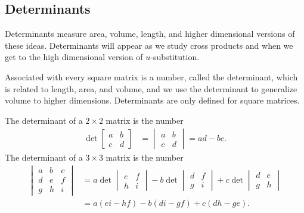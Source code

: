 \subsection{Determinants}



Determinants measure area, volume, length, and higher dimensional versions of these ideas.  Determinants will appear as we study cross products and when we get to the high dimensional version of {$u$}-substitution.


Associated with every square matrix is a number, called the determinant, which is related to length, area, and volume, and we use the determinant to generalize volume to higher dimensions. Determinants are only defined for square matrices.
\begin{definition}
The determinant of a {$2\times 2$} matrix is the number 
\begin{align*}
\det\begin{bmatrix}a&b\\c&d\end{bmatrix} &=\begin{vmatrix}a&b\\c&d\end{vmatrix} = ad-bc.
\end{align*}
The determinant of a {$3\times 3$} matrix is the number 
\begin{align*}
\begin{vmatrix}a&b&c\\d&e&f\\g&h&i\end{vmatrix} &= a\det\begin{vmatrix}e&f\\h&i\end{vmatrix} -b\det\begin{vmatrix}d&f\\g&i\end{vmatrix} +c\det\begin{vmatrix}d&e\\g&h\end{vmatrix}\\
&=a(ei-hf)-b(di-gf)+c(dh-ge).
\end{align*}
\end{definition}

